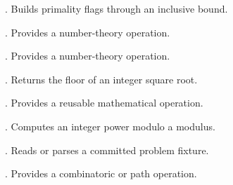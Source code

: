 \begin{description}
\item[\texttt{}] \texttt{}. Builds primality flags through an inclusive bound.
\item[\texttt{}] \texttt{}. Provides a number-theory operation.
\item[\texttt{}] \texttt{}. Provides a number-theory operation.
\item[\texttt{}] \texttt{}. Returns the floor of an integer square root.
\item[\texttt{}] \texttt{}. Provides a reusable mathematical operation.
\item[\texttt{}] \texttt{}. Computes an integer power modulo a modulus.
\item[\texttt{}] \texttt{}. Reads or parses a committed problem fixture.
\item[\texttt{}] \texttt{}. Provides a combinatoric or path operation.
\end{description}

